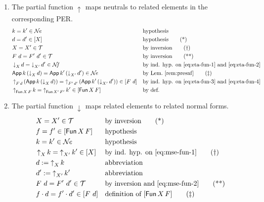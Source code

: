 \documentclass{LMCS}
\theoremstyle{plain}\newtheorem{satz}[thm]{Satz}
\newcommand{\proofLine}[2]{&#1&&\text{#2}}
\newcommand{\upa}[2]{\mathop{\uparrow}\nolimits_{#1}{#2}}
\newcommand{\da}[2]{\mathop{\downarrow}\nolimits_{#1}{#2}}
\newcommand{\perne}{\mathord{\mathcal{N}\!\mathit{e}}}
\newcommand{\pernf}{\mathord{\mathcal{N}\!\mathit{f}}}
\newcommand{\perT}{\mathcal{T}}
\newcommand{\iNe}[2]{\mathsf{App}\,#1\,#2}
\newcommand{\iPi}[2]{\mathsf{Fun}\,#1\,#2}
\begin{document}
{\begin{enumerate}[(a)]
    \begin{enumerate}[(1)]
    \item The partial function $\upa{}{}$ maps neutrals to related elements
      in the corresponding PER.
      \begin{align*}
        \proofLine{k = k' \in \perne}{hypothesis} \\
        \proofLine{d=d'\in [X]}{hypothesis}\tag{*}\label{eq:eta-fun-1}\\
        \proofLine{X=X'\in\perT}{by inversion}\tag{\textdagger}\label{eq:eta-fun-2}\\
        \proofLine{F\ d=F'\ d'\in\perT}{by inversion}\tag{**}\label{eq:eta-fun-3}\\
        \proofLine{\da{X}{d} = \da{X'}{d'} \in \pernf}{by ind. hyp. on \eqref{eq:eta-fun-1} and \eqref{eq:eta-fun-2}}\\
          \proofLine{\iNe{k}{(\da{X}{d})} =\iNe{k'}{(\da{X'}{d'})}\in \perne}{by Lem.~\ref{rem:presnf}}\tag{\textdaggerdbl}\label{eq:eta-fun-4}\\
          \proofLine{\upa{F\,d}{(\iNe{k}{(\da{X}{d})})} = 
                     \upa{F'\,d'}{(\iNe{k'}{(\da{X'}{d'})})} \in [F\ d]}{by ind. hyp. on \eqref{eq:eta-fun-3} and \eqref{eq:eta-fun-4}} \\
        \proofLine{\upa{\iPi X F}{k} = \upa{\iPi{X'}{F'}}{k'} 
          \in [\iPi X F]}{by def.}
        \end{align*}
      \item The partial function $\da{}{}$ maps related elements to related
      normal forms.
        \begin{align*}
        \proofLine{X=X'\in\perT}{by inversion}\tag{*}\label{eq:mse-fun-1}\\
        \proofLine{f = f' \in [\iPi{X}{F}]}{hypothesis}\\
        \proofLine{k = k' \in \perne}{hypothesis}\\
        \proofLine{\upa{X}{k} = \upa{X'}{k'}\in [X]}{by ind. hyp. on \eqref{eq:mse-fun-1}}\tag{\textdagger}\label{eq:mse-fun-2}\\
        \proofLine{d := \upa{X}{k}}{abbreviation}\\
        \proofLine{d' := \upa{X'}{k'}}{abbreviation}\\
\proofLine{F\ d=F'\ d'\in\perT}{by inversion and \eqref{eq:mse-fun-2}}\tag{**}\label{eq:mse-fun-3}\\
        \proofLine{f\cdot d = f'\cdot d' \in [F\ d]}{definition of $[\iPi{X}{F}]$}\tag{\textdaggerdbl}\label{eq:mse-fun-4}\\

\end{align*}
\end{enumerate}
\end{enumerate}}
\end{document}
